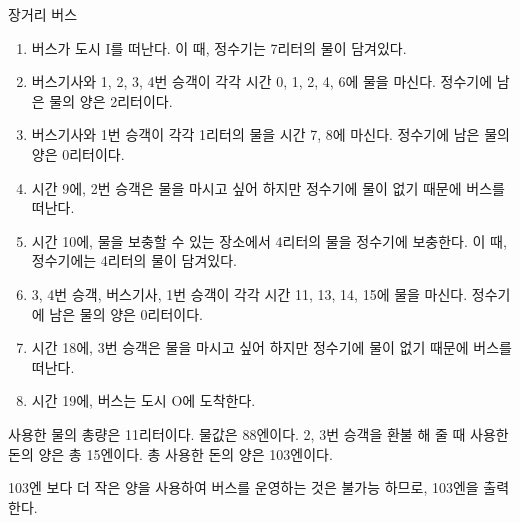 \begin{problem}{장거리 버스}
	\begin{enumerate}
		
		\item 버스가 도시 I를 떠난다. 이 때, 정수기는 7리터의 물이 담겨있다.
		\item 버스기사와 1, 2, 3, 4번 승객이 각각 시간 0, 1, 2, 4, 6에 물을 마신다. 정수기에 남은 물의 양은 2리터이다.
		\item 버스기사와 1번 승객이 각각 1리터의 물을 시간 7, 8에 마신다. 정수기에 남은 물의 양은 0리터이다.
		\item 시간 9에, 2번 승객은 물을 마시고 싶어 하지만 정수기에 물이 없기 때문에 버스를 떠난다.
		\item 시간 10에, 물을 보충할 수 있는 장소에서 4리터의 물을 정수기에 보충한다. 이 때, 정수기에는 4리터의 물이 담겨있다.
		\item 3, 4번 승객, 버스기사, 1번 승객이 각각 시간 11, 13, 14, 15에 물을 마신다. 정수기에 남은 물의 양은 0리터이다.
		\item 시간 18에, 3번 승객은 물을 마시고 싶어 하지만 정수기에 물이 없기 때문에 버스를 떠난다.
		\item 시간 19에, 버스는 도시 O에 도착한다.
	\end{enumerate}

	사용한 물의 총량은 11리터이다. 물값은 88엔이다. 2, 3번 승객을 환불 해 줄 때 사용한 돈의 양은 총 15엔이다. 총 사용한 돈의 양은 103엔이다.
	
	103엔 보다 더 작은 양을 사용하여 버스를 운영하는 것은 불가능 하므로, 103엔을 출력한다.
	
	
	\begin{example}
	\end{example}

	
\end{problem}


